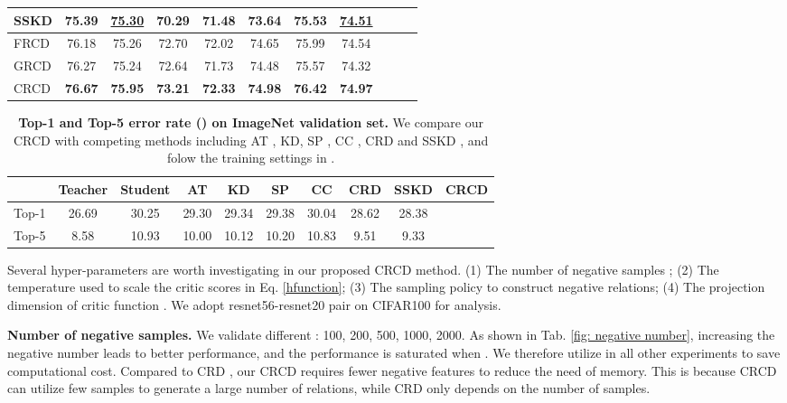 \documentclass[final]{cvpr}
\begin{document}
\begin{table*}[th]
\begin{tabular}{lcccccccccc}
SSKD \cite{SSKD}  & 75.39 & \underline{75.30} & 70.29 & 71.48 & 73.64 & 75.53 & \underline{74.51} \\
\midrule
FRCD & 76.18 & 75.26 & 72.70 & 72.02 & 74.65 & 75.99 & 74.54 \\
GRCD & 76.27 & 75.24 & 72.64 & 71.73 & 74.48 & 75.57 & 74.32 \\
CRCD   &  \textbf{ 76.67} &\textbf{ 75.95} &\textbf{ 73.21} & \textbf{72.33} & \textbf{74.98} & \textbf{76.42} & \textbf{74.97}\\
\bottomrule
\end{tabular}
    \vspace{-0.2em}
    \label{tab:resultwithsot}
\end{table*}



\begin{table*}[t]
\small
    \centering
    \caption{\textbf{Top-1 and Top-5 error rate ()  on ImageNet validation set.} We compare our CRCD with competing methods including AT \cite{ATloss}, KD\cite{hinton2015distilling}, SP \cite{tung2019similarity}, CC \cite{peng2019correlation}, CRD \cite{crd} and  SSKD \cite{SSKD}, and folow the training settings in \cite{crd}. 
}
    \begin{tabular}{c|cc|cccccc|c}
\toprule
 & Teacher & Student & AT & KD & SP & CC  & CRD & SSKD & CRCD \\
 \midrule
 Top-1 & 26.69 & 30.25 & 29.30 & 29.34 & 29.38 & 30.04 & 28.62 & 28.38 &  \\
Top-5 & 8.58 & 10.93 & 10.00 & 10.12 & 10.20 & 10.83 & 9.51 & 9.33 &  \\
\bottomrule
\end{tabular}
    \vspace{-0.4em}
    \label{tab:imagenet}
\end{table*}


Several hyper-parameters are worth investigating in our proposed CRCD method. (1) The number of negative samples ; 
(2) The temperature used to scale the critic scores in Eq. \ref{hfunction}; (3) The sampling policy to construct negative relations; (4) The projection dimension of critic function .
We adopt resnet56-resnet20 pair on CIFAR100 for analysis.

\noindent \textbf{Number of negative samples.} We validate different : 100,  200,  500, 1000, 2000. As shown in Tab. \ref{fig: negative number}, increasing the negative number leads to better performance, and the performance is saturated when . We therefore utilize  in all other experiments to save computational cost. Compared to  CRD \cite{crd}, our CRCD requires fewer negative features to reduce the need of memory. This is because CRCD can utilize few samples to generate a large number of relations, while CRD only depends on the number of samples. 
\end{document}
